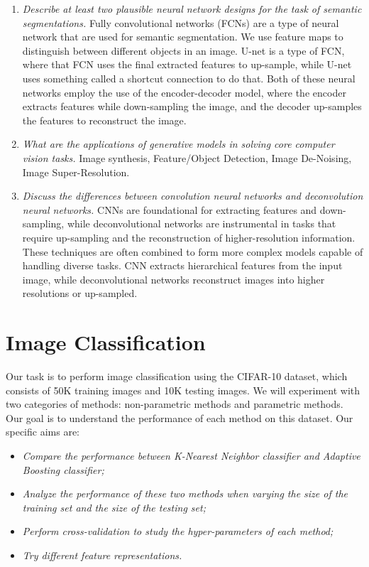 \documentclass[11pt]{article}
\begin{document}
\begin{enumerate}
        \item \textit{Describe at least two plausible neural network designs for the task of semantic segmentations.}
        Fully convolutional networks (FCNs) are a type of neural network that are used for semantic segmentation. We
        use feature maps to distinguish between different objects in an image.
        U-net is a type of FCN, where that FCN uses the final extracted features to up-sample, while U-net uses
        something called a shortcut connection to do that.
        Both of these neural networks employ the use of the encoder-decoder model, where the encoder extracts features
        while down-sampling the image, and the decoder up-samples the features to reconstruct the image.

        \item \textit{What are the applications of generative models in solving core computer vision tasks.}
        Image synthesis, Feature/Object Detection, Image De-Noising, Image Super-Resolution.

        \item \textit{Discuss the differences between convolution neural networks and deconvolution neural networks.}
        CNNs are foundational for extracting features and down-sampling, while deconvolutional networks are
        instrumental in tasks that require up-sampling and the reconstruction of higher-resolution information.
        These techniques are often combined to form more complex models capable of handling diverse tasks.
        CNN extracts hierarchical features from the input image, while deconvolutional networks reconstruct images
        into higher resolutions or up-sampled.
    \end{enumerate}


    \section{Image Classification}

    Our task is to perform image classification using the CIFAR-10 dataset, which consists of 50K training images and
    10K testing images. We will experiment with two categories of methods: non-parametric methods and parametric methods.
    Our goal is to understand the performance of each method on this dataset. Our specific aims are:
    \begin{itemize}
        \item \textit{Compare the performance between K-Nearest Neighbor classifier and Adaptive Boosting classifier;}
        \item \textit{Analyze the performance of these two methods when varying the size of the training set
        and the size of the testing set;}
        \item \textit{Perform cross-validation to study the hyper-parameters of each method;}
        \item \textit{Try different feature representations.}
    \end{itemize}
\end{document}
